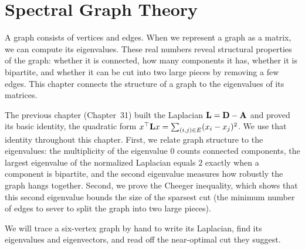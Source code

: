 \chapter{Spectral Graph Theory}

A graph consists of vertices and edges. When we represent a graph as a matrix, we can compute its eigenvalues. These real numbers reveal structural properties of the graph: whether it is connected, how many components it has, whether it is bipartite, and whether it can be cut into two large pieces by removing a few edges. This chapter connects the structure of a graph to the eigenvalues of its matrices.

The previous chapter (Chapter~31) built the Laplacian $\mathbf{L} = \mathbf{D} - \mathbf{A}$ and proved its basic identity, the quadratic form $x^\top \mathbf{L} x = \sum_{(i,j)\in E}(x_i - x_j)^2$. We use that identity throughout this chapter. First, we relate graph structure to the eigenvalues: the multiplicity of the eigenvalue $0$ counts connected components, the largest eigenvalue of the normalized Laplacian equals $2$ exactly when a component is bipartite, and the second eigenvalue measures how robustly the graph hangs together. Second, we prove the Cheeger inequality, which shows that this second eigenvalue bounds the size of the sparsest cut (the minimum number of edges to sever to split the graph into two large pieces).

We will trace a six-vertex graph by hand to write its Laplacian, find its eigenvalues and eigenvectors, and read off the near-optimal cut they suggest.

